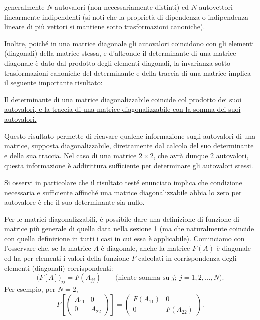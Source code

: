 \documentclass[11pt, a4paper]{book}
\numberwithin{equation}{section}
\begin{document}

generalmente $N$ autovalori (non necessariamente distinti) ed $N$
autovettori linearmente indipendenti (si noti che la proprietà di
dipendenza o indipendenza lineare di più vettori si mantiene sotto
trasformazioni canoniche).

Inoltre, poiché in una matrice diagonale gli autovalori coincidono con
gli elementi (diagonali) della matrice stessa, e d'altronde il
determinante di una matrice diagonale è dato dal prodotto degli elementi
diagonali, la invarianza sotto trasformazioni canoniche del determinante e
della traccia di una matrice implica il seguente importante risultato:

\uline{Il determinante di una matrice diagonalizzabile coincide col
prodotto dei suoi autovalori, e la traccia di una matrice
diagonalizzabile con la somma dei suoi autovalori.}

Questo risultato permette di ricavare qualche informazione sugli
autovalori di una matrice, supposta diagonalizzabile, direttamente dal
calcolo del suo determinante e della sua traccia. Nel caso di una matrice
$2\times 2$, che avrà dunque 2 autovalori, questa informazione è
addirittura sufficiente per determinare gli autovalori stessi.

Si osservi in particolare che il risultato testé enunciato implica che
condizione necessaria e sufficiente affinché una matrice diagonalizzabile
abbia lo zero per autovalore è che il suo determinante sia nullo.

Per le matrici diagonalizzabili, è possibile dare una definizione di
funzione di matrice più generale di quella data nella sezione 1 (ma che
naturalmente coincide con quella definizione in tutti i casi in cui essa è
applicabile). Cominciamo con l'osservare che, se la matrice $A$ è
diagonale, anche la matrice $F(A)$ è diagonale ed ha per elementi i valori
della funzione $F$ calcolati in corrispondenza degli elementi (diagonali)
corrispondenti:
\begin{equation}
\bigl(F[A]\bigr)_{jj} = F(A_{jj})
\qquad \text{(niente somma su } j;\ j=1,2,\ldots,N\text{)}.
\tag{21a}
\end{equation}
Per esempio, per $N=2$,
\begin{equation}
F\!\left[\begin{pmatrix} A_{11} & 0 \\ 0 & A_{22} \end{pmatrix}\right]
= \begin{pmatrix} F(A_{11}) & 0 \\ 0 & F(A_{22}) \end{pmatrix}.
\tag{21b}
\end{equation}
\end{document}
